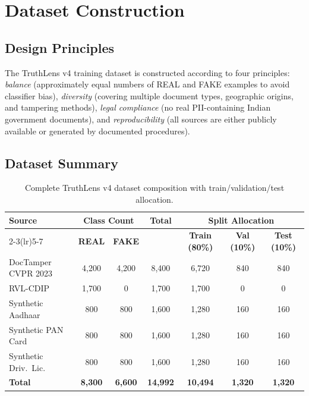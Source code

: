 \documentclass[12pt,a4paper,oneside]{report}
\begin{document}
\section{Dataset Construction}
\label{sec:dataset}

\subsection{Design Principles}

The TruthLens v4 training dataset is constructed according to four principles:
\textit{balance} (approximately equal numbers of REAL and FAKE examples to avoid
classifier bias), \textit{diversity} (covering multiple document types, geographic
origins, and tampering methods), \textit{legal compliance} (no real PII-containing
Indian government documents), and \textit{reproducibility} (all sources are either
publicly available or generated by documented procedures).

\subsection{Dataset Summary}

\begin{table}[H]
\centering
\caption{Complete TruthLens v4 dataset composition with train/validation/test allocation.}
\label{tab:dataset_full}
\renewcommand{\arraystretch}{1.3}
\begin{tabular}{lcccccc}
\toprule
\multirow{2}{*}{\textbf{Source}} & \multicolumn{2}{c}{\textbf{Class Count}}
& \multirow{2}{*}{\textbf{Total}} &
\multicolumn{3}{c}{\textbf{Split Allocation}} \\
\cmidrule(lr){2-3}\cmidrule(lr){5-7}
& \textbf{REAL} & \textbf{FAKE} & & \textbf{Train (80\%)} & \textbf{Val (10\%)} & \textbf{Test (10\%)} \\
\midrule
DocTamper CVPR 2023  & 4,200 & 4,200 & 8,400  & 6,720  & 840  & 840  \\
RVL-CDIP             & 1,700 & 0     & 1,700  & 1,700  & 0    & 0    \\
Synthetic Aadhaar    & 800   & 800   & 1,600  & 1,280  & 160  & 160  \\
Synthetic PAN Card   & 800   & 800   & 1,600  & 1,280  & 160  & 160  \\
Synthetic Driv.\ Lic.& 800   & 800   & 1,600  & 1,280  & 160  & 160  \\
\midrule
\textbf{Total}       & \textbf{8,300} & \textbf{6,600} & \textbf{14,992} & \textbf{10,494} & \textbf{1,320} & \textbf{1,320} \\
\bottomrule
\end{tabular}
\end{table}
\end{document}
